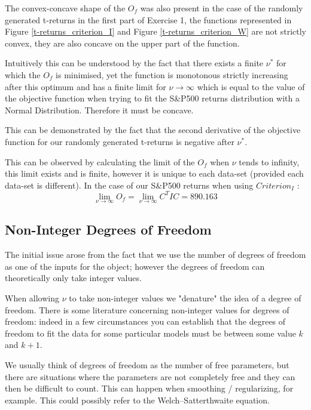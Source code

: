The convex-concave shape of the $O_f$ was also present in the case of the randomly generated t-returns in the first part of Exercise 1, the functions represented in Figure \ref{t-returns_criterion_I} and Figure \ref{t-returns_criterion_W} are not strictly convex, they are also concave on the upper part of the function.
\smallskip\par
Intuitively this can be understood by the fact that there exists a finite $\nu^*$ for which the $O_f$ is minimised, yet the function is monotonous strictly increasing after this optimum and has a finite limit for $\nu \to \infty$ which is equal to the value of the objective function when trying to fit the S\&P500 returns distribution with a Normal Distribution. Therefore it must be concave. 
\smallskip\par
This can be demonstrated by the fact that the second derivative of the objective function for our randomly generated t-returns is negative after $\nu^*$.
\smallskip\par
This can be observed by calculating the limit of the $O_f$ when $\nu$ tends to infinity, this limit exists and is finite, however it is unique to each data-set (provided each data-set is different). In the case of our S\&P500 returns when using $Criterion_I$ :
\begin{equation*}
    \lim_{\nu \to \infty}O_f = \lim_{\nu \to \infty}C^T I C = 890.163
\end{equation*}

\subsection{Non-Integer Degrees of Freedom}
The initial issue arose from the fact that we use the number of degrees of freedom as one of the inputs for the object; however the degrees of freedom can theoretically only take integer values.
\smallskip\par
When allowing $\nu$ to take non-integer values we "denature" the idea of a degree of freedom. There is some literature concerning non-integer values for degrees of freedom: indeed in a few circumstances you can establish that the degrees of freedom to fit the data for some particular models must be between some value $k$ and $k+1$.
\smallskip\par
We usually think of degrees of freedom as the number of free parameters, but there are situations where the parameters are not completely free and they can then be difficult to count. This can happen when smoothing / regularizing, for example. This could possibly refer to the Welch–Satterthwaite equation.

